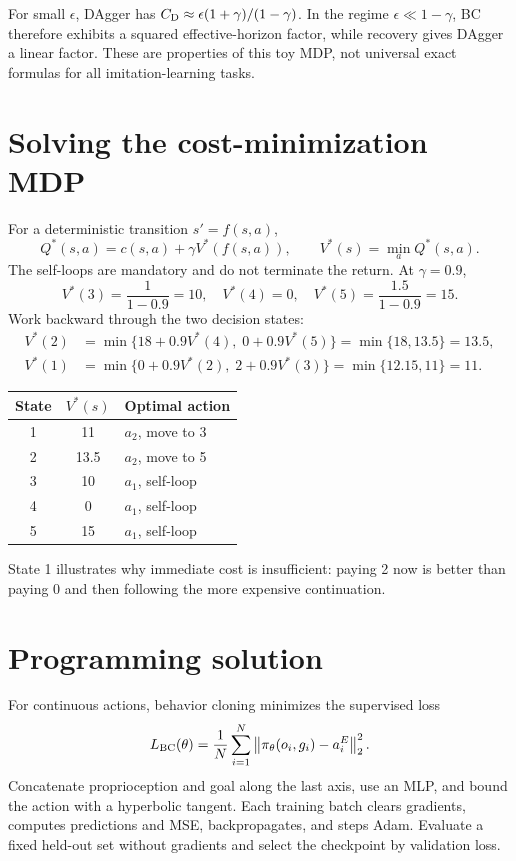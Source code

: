 For small $\epsilon$, DAgger has
$C_{\rm D}\approx\epsilon(1+\gamma)/(1-\gamma)$. In the regime
$\epsilon\ll1-\gamma$, BC therefore exhibits a squared effective-horizon
factor, while recovery gives DAgger a linear factor. These are properties of
this toy MDP, not universal exact formulas for all imitation-learning tasks.

\newpage
\section{Solving the cost-minimization MDP}
For a deterministic transition $s'=f(s,a)$,
\[
 Q^*(s,a)=c(s,a)+\gamma V^*(f(s,a)),\qquad
 V^*(s)=\min_a Q^*(s,a).
\]
The self-loops are mandatory and do not terminate the return. At $\gamma=0.9$,
\[
 V^*(3)=\frac{1}{1-0.9}=10,\quad
 V^*(4)=0,\quad
 V^*(5)=\frac{1.5}{1-0.9}=15.
\]
Work backward through the two decision states:
\begin{align*}
 V^*(2)&=\min\{18+0.9V^*(4),\;0+0.9V^*(5)\}
         =\min\{18,13.5\}=13.5,\\
 V^*(1)&=\min\{0+0.9V^*(2),\;2+0.9V^*(3)\}
         =\min\{12.15,11\}=11.
\end{align*}
\begin{center}
\begin{tabular}{ccl}
\toprule State & $V^*(s)$ & Optimal action\\\midrule
1 & 11 & $a_2$, move to 3\\
2 & 13.5 & $a_2$, move to 5\\
3 & 10 & $a_1$, self-loop\\
4 & 0 & $a_1$, self-loop\\
5 & 15 & $a_1$, self-loop\\\bottomrule
\end{tabular}
\end{center}
State 1 illustrates why immediate cost is insufficient: paying 2 now is
better than paying 0 and then following the more expensive continuation.

\section{Programming solution}
For continuous actions, behavior cloning minimizes the supervised loss
\[
 L_{\rm BC}(\theta)=\frac1N\sum_{i=1}^N
 \left\lVert \pi_\theta(o_i,g_i)-a_i^E\right\rVert_2^2.
\]
Concatenate proprioception and goal along the last axis, use an MLP, and bound
the action with a hyperbolic tangent. Each training batch clears gradients,
computes predictions and MSE, backpropagates, and steps Adam. Evaluate a fixed
held-out set without gradients and select the checkpoint by validation loss.

